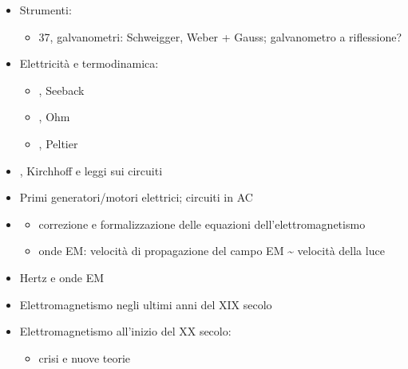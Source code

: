 \documentclass[letterpaper,10pt,italian]{jupyterBook}
\begin{document}
\begin{itemize}
\begin{itemize}
\end{itemize}

\item {} 
\sphinxAtStartPar
Strumenti:
\begin{itemize}
\item {} 
\sphinxhyphen{}37, galvanometri: Schweigger, Weber + Gauss; galvanometro a riflessione?

\end{itemize}

\item {} 
\sphinxAtStartPar
Elettricità e termodinamica:
\begin{itemize}
\item {} 
, Seeback

\item {} 
, Ohm

\item {} 
, Peltier

\end{itemize}

\item {} 
, Kirchhoff e leggi sui circuiti

\item {} 
\sphinxAtStartPar
Primi generatori/motori elettrici; circuiti in AC

\item {} 
\sphinxAtStartPar
{}
\begin{itemize}
\item {} 
\sphinxAtStartPar
correzione e formalizzazione delle equazioni dell’elettromagnetismo

\item {} 
\sphinxAtStartPar
onde EM: velocità di propagazione del campo EM \textasciitilde{} velocità della luce

\end{itemize}

\item {} 
\sphinxAtStartPar
Hertz e onde EM

\item {} 
\sphinxAtStartPar
Elettromagnetismo negli ultimi anni del XIX secolo

\item {} 
\sphinxAtStartPar
Elettromagnetismo all’inizio del XX secolo:
\begin{itemize}
\item {} 
\sphinxAtStartPar
crisi e nuove teorie

\end{itemize}

\end{itemize}
\end{document}
